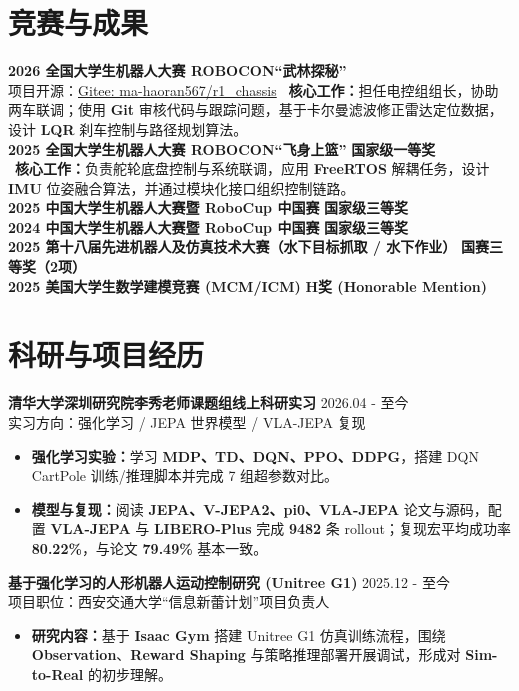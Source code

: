 \documentclass[11pt,a4paper]{article}
\begin{document}
\section{竞赛与成果}
\textbf{2026 全国大学生机器人大赛 ROBOCON“武林探秘”}\\
{\small 项目开源：\href{https://gitee.com/ma-haoran567/r1_chassis}{Gitee: ma-haoran567/r1\_chassis}}
{\small \textbullet\ \textbf{核心工作：}担任电控组组长，协助两车联调；使用 \textbf{Git} 审核代码与跟踪问题，基于卡尔曼滤波修正雷达定位数据，设计 \textbf{LQR} 刹车控制与路径规划算法。}\\
\textbf{2025 全国大学生机器人大赛 ROBOCON“飞身上篮”} \hfill \textbf{国家级一等奖}\\
{\small \textbullet\ \textbf{核心工作：}负责舵轮底盘控制与系统联调，应用 \textbf{FreeRTOS} 解耦任务，设计 \textbf{IMU} 位姿融合算法，并通过模块化接口组织控制链路。}\\
\textbf{2025 中国大学生机器人大赛暨 RoboCup 中国赛} \hfill \textbf{国家级三等奖}\\
\textbf{2024 中国大学生机器人大赛暨 RoboCup 中国赛} \hfill \textbf{国家级三等奖}\\
\textbf{2025 第十八届先进机器人及仿真技术大赛（水下目标抓取 / 水下作业）} \hfill \textbf{国赛三等奖（2项）}\\
\textbf{2025 美国大学生数学建模竞赛 (MCM/ICM)} \hfill \textbf{H奖 (Honorable Mention)}

\section{科研与项目经历}
\textbf{清华大学深圳研究院李秀老师课题组线上科研实习} \hfill 2026.04 - 至今 \\
{\small 实习方向：强化学习 / JEPA 世界模型 / VLA-JEPA 复现}
\begin{itemize}[leftmargin=1.5em, noitemsep, topsep=2pt]
    \item \textbf{强化学习实验：}学习 \textbf{MDP、TD、DQN、PPO、DDPG}，搭建 DQN CartPole 训练/推理脚本并完成 7 组超参数对比。
    \item \textbf{模型与复现：}阅读 \textbf{JEPA、V-JEPA2、pi0、VLA-JEPA} 论文与源码，配置 \textbf{VLA-JEPA} 与 \textbf{LIBERO-Plus} 完成 \textbf{9482} 条 rollout；复现宏平均成功率 \textbf{80.22\%}，与论文 \textbf{79.49\%} 基本一致。
\end{itemize}

\textbf{基于强化学习的人形机器人运动控制研究 (Unitree G1)} \hfill 2025.12 - 至今 \\
{\small 项目职位：西安交通大学“信息新蕾计划”项目负责人}
\begin{itemize}[leftmargin=1.5em, noitemsep, topsep=2pt]
    \item \textbf{研究内容：}基于 \textbf{Isaac Gym} 搭建 Unitree G1 仿真训练流程，围绕 \textbf{Observation}、\textbf{Reward Shaping} 与策略推理部署开展调试，形成对 \textbf{Sim-to-Real} 的初步理解。
\end{itemize}
\end{document}
